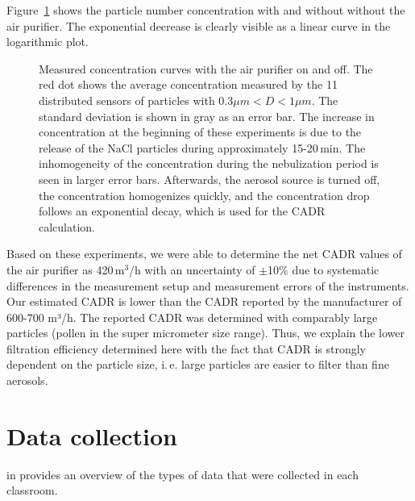 \documentclass[fleqn,11pt]{wlscirep_supp}
\newcommand\ie{i.\,e.\xspace}
\begin{document}
Figure~\ref{fig:experiment} shows the particle number concentration with and without without the air purifier. The exponential decrease is clearly visible as a linear curve in the logarithmic plot.

\begin{figure}
    \centering
    \caption{Measured concentration curves with the air purifier on and off. The red dot shows the average concentration measured by the 11 distributed sensors of particles with $0.3\mu m < D < 1 \mu m$. The standard deviation is shown in gray as an error bar. The increase in concentration at the beginning of these experiments is due to the release of the NaCl particles during approximately 15-20\,min. The inhomogeneity of the concentration during the nebulization period is seen in larger error bars. Afterwards, the aerosol source is turned off, the concentration homogenizes quickly, and the concentration drop follows an exponential decay, which is used for the CADR calculation.}
    \label{fig:experiment}
\end{figure}

Based on these experiments, we were able to determine the net CADR values of the air purifier as 420\,m$^3$/h with an uncertainty of $\pm$10\% due to systematic differences in the measurement setup and measurement errors of the instruments. Our estimated CADR is lower than the CADR reported by the manufacturer of 600-700 m³/h. The reported CADR was determined with comparably large particles (pollen in the super micrometer size range). Thus, we explain the lower filtration efficiency determined here with the fact that CADR is strongly dependent on the particle size, \ie large particles are easier to filter than fine aerosols.


\section{Data collection}\label{sec:data-collection}

 in \supp provides an overview of the types of data that were collected in each classroom.
\end{document}
